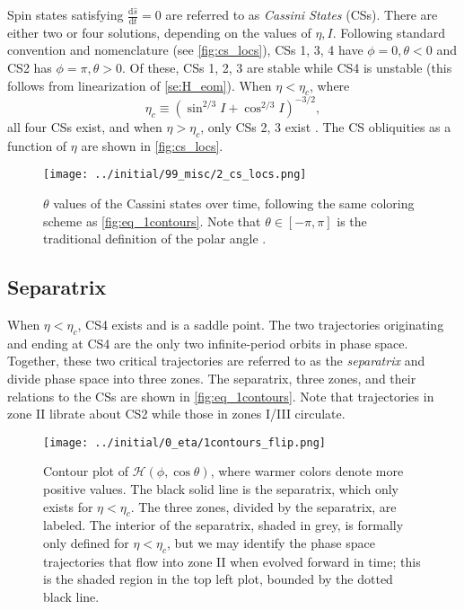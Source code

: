 \documentclass[
        fleqn,
        usenatbib,
    ]{mnras}
\newcommand*{\rd}[2]{\frac{\mathrm{d}#1}{\mathrm{d}#2}}
\newcommand*{\p}[1]{\left(#1\right)}
\begin{document}
Spin states satisfying $\rd{\hat{s}}{t} = 0$ are referred to as \emph{Cassini
States} (CSs). There are either two or four solutions, depending on the values
of $\eta, I$. Following standard convention and nomenclature (see
\autoref{fig:cs_locs}), CSs 1, 3, 4 have $\phi = 0, \theta < 0$ and CS2 has
$\phi = \pi, \theta > 0$. Of these, CSs 1, 2, 3 are stable while CS4 is unstable
(this follows from linearization of \autoref{se:H_eom}). When $\eta < \eta_c$,
where
\begin{equation}
    \eta_c \equiv \p{\sin^{2/3}I + \cos^{2/3}I}^{-3/2},
\end{equation}
all four CSs exist, and when $\eta > \eta_c$, only CSs 2, 3 exist
\citep{henrard1987,ward2004I}. The CS obliquities as a function of $\eta$ are
shown in \autoref{fig:cs_locs}.
\begin{figure}
    \centering
    \texttt{[image: ../initial/99\_misc/2\_cs\_locs.png]}
    \caption{$\theta$ values of the Cassini states over time, following the same
    coloring scheme as \autoref{fig:eq_1contours}. Note that $\theta \in [-\pi,
    \pi]$ is the traditional definition of the polar angle
    \citep[see e.g.][]{colombo1966,peale1969,henrard1987}.}\label{fig:cs_locs}
\end{figure}

\subsection{Separatrix}

When $\eta < \eta_c$, CS4 exists and is a saddle point. The two trajectories
originating and ending at CS4 are the only two infinite-period orbits in phase
space. Together, these two critical trajectories are referred to as the
\emph{separatrix} and divide phase space into three zones. The separatrix, three
zones, and their relations to the CSs are shown in \autoref{fig:eq_1contours}.
Note that trajectories in zone II librate about CS2 while those in zones I/III
circulate.
\begin{figure*}
    \centering
    \texttt{[image: ../initial/0\_eta/1contours\_flip.png]}
    \caption{Contour plot of $\mathcal{H}\p{\phi, \cos \theta}$, where warmer
    colors denote more positive values. The black solid line is the separatrix,
    which only exists for $\eta < \eta_c$. The three zones, divided by the
    separatrix, are labeled. The interior of the separatrix, shaded in grey, is
    formally only defined for $\eta < \eta_c$, but we may identify the phase
    space trajectories that flow into zone II when evolved forward in time; this
    is the shaded region in the top left plot, bounded by the dotted black
    line.}\label{fig:eq_1contours}
\end{figure*}
\end{document}
